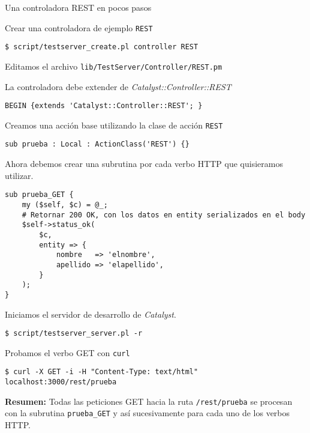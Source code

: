\begin{frame}{Una controladora REST en pocos pasos} %

    \begin{enumerate}
        \item Crear una controladora de ejemplo \texttt{REST}
        \begin{verbatim}
$ script/testserver_create.pl controller REST
        \end{verbatim}
        \item Editamos el archivo \texttt{lib/TestServer/Controller/REST.pm}
        \item La controladora debe extender de
        \textit{Catalyst::Controller::REST} 
        \begin{lstlisting}
BEGIN {extends 'Catalyst::Controller::REST'; }
        \end{lstlisting}
        \item Creamos una acción base utilizando la clase de acción
        \texttt{REST}
        \begin{lstlisting}
sub prueba : Local : ActionClass('REST') {}
        \end{lstlisting}

        \item Ahora debemos crear una subrutina por cada verbo HTTP que
        quisieramos utilizar. 
        \begin{lstlisting}
sub prueba_GET {
    my ($self, $c) = @_;
    # Retornar 200 OK, con los datos en entity serializados en el body
    $self->status_ok(
        $c,
        entity => {
            nombre   => 'elnombre',
            apellido => 'elapellido',
        }
    );
}
        \end{lstlisting}

        \item Iniciamos el servidor de desarrollo de \textit{Catalyst}. 
        \begin{verbatim}
$ script/testserver_server.pl -r
        \end{verbatim}

        \footnotesize{
        \item Probamos el verbo GET con \texttt{curl}
        \begin{verbatim}
$ curl -X GET -i -H "Content-Type: text/html" localhost:3000/rest/prueba
        \end{verbatim}
        }
    \end{enumerate}

    \textbf{Resumen:} Todas las peticiones GET hacia la ruta
    \texttt{/rest/prueba} se procesan con la subrutina \texttt{prueba\_GET} y
    así sucesivamente para cada uno de los verbos HTTP.
\end{frame}

